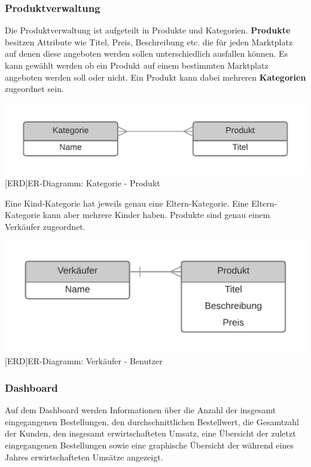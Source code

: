 	 
	
	\subsubsection{Produktverwaltung}
	
	Die Produktverwaltung ist aufgeteilt in Produkte und Kategorien. \textbf{Produkte} besitzen Attribute wie Titel, Preis, Beschreibung etc. die für jeden Marktplatz auf denen diese angeboten werden sollen unterschiedlich ausfallen können. Es kann gewählt werden ob ein Produkt auf einem bestimmten Marktplatz angeboten werden soll oder nicht. Ein Produkt kann dabei mehreren \textbf{Kategorien} zugeordnet sein.\\
	\begin{minipage}{\linewidth}
		\vspace{1em}
		\centering
		\includegraphics[width=0.6\linewidth]{img/ERD_Category_Product}
		[ERD]{ER-Diagramm: Kategorie - Produkt}
		\label{fig:header}
		\vspace{1em}
	\end{minipage}
	Eine Kind-Kategorie hat jeweils genau eine Eltern-Kategorie. Eine Eltern-Kategorie kann aber mehrere Kinder haben. Produkte sind genau einem Verkäufer zugeordnet. \\
	\begin{minipage}{\linewidth}
		\vspace{1em}
		\centering
		\includegraphics[width=0.6\linewidth]{img/ERD_Seller_Product}
		[ERD]{ER-Diagramm: Verkäufer - Benutzer}
		\label{fig:header}
		\vspace{1em}
	\end{minipage}
	
	\subsubsection{Dashboard}
	
	Auf dem Dashboard werden Informationen über die Anzahl der insgesamt eingegangenen Bestellungen, den durchschnittlichen Bestellwert, die Gesamtzahl der Kunden, den insgesamt erwirtschafteten Umsatz, eine Übersicht der zuletzt eingegangenen Bestellungen sowie eine graphische Übersicht der während eines Jahres erwirtschafteten Umsätze angezeigt. 
	
